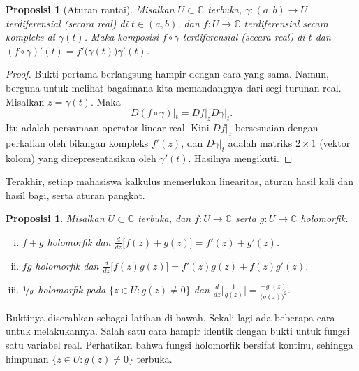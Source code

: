 \documentclass[12pt,openany]{book}
\newcommand{\C}{{\mathbb{C}}}
\theoremstyle{plain}
\newtheorem{prop}[thm]{Proposisi}
\theoremstyle{remark}
\theoremstyle{definition}
\theoremstyle{exercise}
\theoremstyle{example}
\begin{document}
\begin{prop}[Aturan rantai]
%
\label{prop:chainrule2}%
Misalkan $U \subset \C$ terbuka,
$\gamma \colon (a,b) \to U$ terdiferensial (secara real) di $t \in (a,b)$,
dan $f \colon U \to \C$ terdiferensial secara kompleks di $\gamma(t)$.
Maka komposisi $f \circ \gamma$ terdiferensial (secara real)
di $t$ dan $(f \circ \gamma)'(t) = f'\bigl(\gamma(t)\bigr) \gamma'(t)$.
\end{prop}

\begin{proof}
Bukti pertama berlangsung hampir dengan cara yang sama.  Namun, berguna untuk melihat
bagaimana kita memandangnya dari segi turunan real.
Misalkan $z = \gamma(t)$.  Maka
\begin{equation*}
D(f \circ \gamma)|_{t} =
Df|_z D\gamma|_{t} .
\end{equation*}
Itu adalah persamaan operator linear real.  Kini $Df|_z$ bersesuaian
dengan perkalian oleh bilangan kompleks $f'(z)$, dan $D\gamma|_{t}$
adalah matriks $2 \times 1$ (vektor kolom) yang direpresentasikan oleh $\gamma'(t)$.
Hasilnya mengikuti.
\end{proof}

Terakhir, setiap mahasiswa kalkulus memerlukan linearitas, aturan hasil kali dan hasil bagi,
serta aturan pangkat.

\begin{prop} \label{prop:sumproddiv}
Misalkan $U \subset \C$ terbuka, dan $f \colon U \to \C$ serta
$g \colon U \to \C$ holomorfik.
\begin{enumerate}[(i)]
\item
$f+g$ holomorfik dan $\frac{d}{dz}\bigl[ f(z)+g(z) \bigr] = f'(z) + g'(z)$.
\item
$fg$ holomorfik dan $\frac{d}{dz}\bigl[f(z) g(z) \bigr] = f'(z)g(z) + f(z)g'(z)$.
\item
$\nicefrac{1}{g}$ holomorfik pada $\bigl\{ z \in U : g(z) \neq 0 \bigr\}$ dan
$\frac{d}{dz}\bigl[\frac{1}{g(z)}\bigr] = \frac{-g'(z)}{{\bigl(g(z)\bigr)}^2}$.
\end{enumerate}
\end{prop}

Buktinya diserahkan sebagai latihan di bawah.  Sekali lagi ada beberapa cara
untuk melakukannya.  Salah satu cara hampir identik dengan
bukti untuk fungsi satu variabel real.
Perhatikan bahwa
fungsi holomorfik bersifat kontinu, sehingga himpunan
$\bigl\{ z \in U : g(z) \neq 0 \bigr\}$ terbuka.
\end{document}
